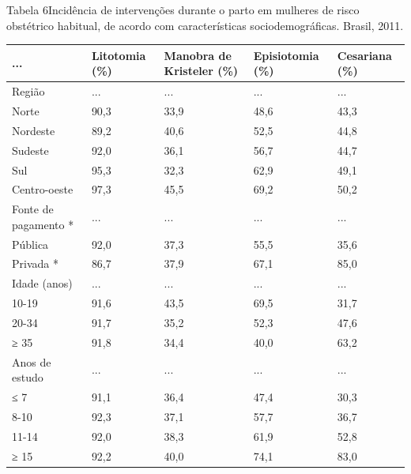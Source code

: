 \documentclass{article}
\begin{document}
Tabela 6Incidência de intervenções durante o parto em mulheres de risco
obstétrico habitual, de acordo com características sociodemográficas.
Brasil, 2011.
\begin{table}
\begin{xtabular}{ l | l | l | l | l }
\hline... & Litotomia (\%) & Manobra de Kristeler (\%) & Episiotomia (\%) & Cesariana
(\%)\\ \hline
Região
& ...
& ...
& ...
& ...
\\ \hline

Norte
& 90,3
& 33,9
& 48,6
& 43,3
\\ \hline

Nordeste
& 89,2
& 40,6
& 52,5
& 44,8
\\ \hline

Sudeste
& 92,0
& 36,1
& 56,7
& 44,7
\\ \hline

Sul
& 95,3
& 32,3
& 62,9
& 49,1
\\ \hline

Centro-oeste
& 97,3
& 45,5
& 69,2
& 50,2
\\ \hline

Fonte de pagamento *
& ...
& ...
& ...
& ...
\\ \hline

Pública
& 92,0
& 37,3
& 55,5
& 35,6
\\ \hline

Privada *
& 86,7
& 37,9
& 67,1
& 85,0
\\ \hline

Idade (anos)
& ...
& ...
& ...
& ...
\\ \hline

10-19
& 91,6
& 43,5
& 69,5
& 31,7
\\ \hline

20-34
& 91,7
& 35,2
& 52,3
& 47,6
\\ \hline

≥ 35
& 91,8
& 34,4
& 40,0
& 63,2
\\ \hline

Anos de estudo
& ...
& ...
& ...
& ...
\\ \hline

≤ 7
& 91,1
& 36,4
& 47,4
& 30,3
\\ \hline

8-10
& 92,3
& 37,1
& 57,7
& 36,7
\\ \hline

11-14
& 92,0
& 38,3
& 61,9
& 52,8
\\ \hline

≥ 15
& 92,2
& 40,0
& 74,1
& 83,0
\\ \hline


\end{xtabular}
\end{table}
\end{document}
